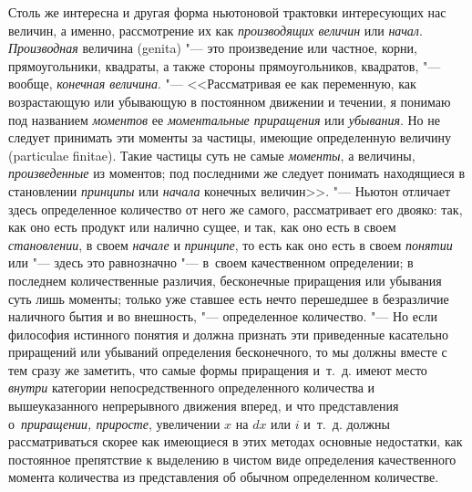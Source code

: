Столь же интересна и другая форма ньютоновой трактовки интересующих нас
величин, а именно, рассмотрение их как {\em производящих величин} или
{\em начал}. {\em Производная} величина (genita) "--- это произведение или
частное, корни, прямоугольники, квадраты, а также стороны прямоугольников,
квадратов, "--- вообще, {\em конечная величина}. "--- <<Рассматривая ее как
переменную, как возрастающую или убывающую в постоянном движении и течении,
я понимаю под названием {\em моментов} ее {\em моментальные приращения} или
{\em убывания}. Но не следует принимать эти моменты за частицы, имеющие
определенную величину (particulae finitae). Такие частицы суть не самые
{\em моменты}, а величины, {\em произведенные} из моментов; под последними же
следует понимать находящиеся в становлении {\em принципы} или {\em начала}
конечных величин>>. "--- Ньютон отличает здесь определенное количество от него
же самого, рассматривает его двояко: так, как оно есть продукт или налично
сущее, и так, как оно есть в своем {\em становлении}, в своем {\em начале} и
{\em принципе}, то есть как оно есть в своем {\em понятии} или "--- здесь это
равнозначно "--- в~своем качественном определении; в последнем количественные
различия, бесконечные приращения или убывания суть лишь моменты; только уже
ставшее есть нечто перешедшее в безразличие наличного бытия и во внешность,
"--- определенное количество. "--- Но если философия истинного понятия и должна
признать эти приведенные касательно приращений или убываний определения
бесконечного, то мы должны вместе с тем сразу же заметить, что самые формы
приращения и~т.~д. имеют место {\em внутри} категории непосредственного
определенного количества и вышеуказанного непрерывного движения вперед, и что
представления о~{\em приращении, приросте}, увеличении $x$ на
$dx$ или $i$ и~т.~д. должны рассматриваться скорее как имеющиеся в этих
методах основные недостатки, как постоянное препятствие к выделению в чистом
виде определения качественного момента количества из представления об обычном
определенном количестве.

